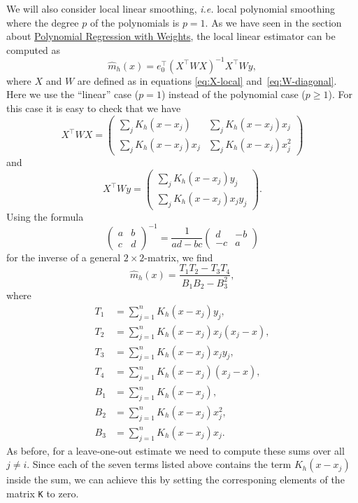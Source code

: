 \documentclass[
  a4paper,
]{article}
\theoremstyle{definition}
\theoremstyle{definition}
\theoremstyle{definition}
\theoremstyle{definition}
\theoremstyle{remark}
\begin{document}
We will also consider local linear smoothing, \emph{i.e.} local polynomial
smoothing where the degree \(p\) of the polynomials is \(p=1\).
As we have seen in the section about \protect\hyperlink{polynomial-regression-with-weights}{Polynomial Regression with Weights},
the local linear estimator can be computed as
\begin{equation*}
  \hat m_h(x)
  = e_0^\top (X^\top W X)^{-1} X^\top W y,
\end{equation*}
where \(X\) and \(W\) are defined as in equations \eqref{eq:X-local}
and~\eqref{eq:W-diagonal}.
Here we use the ``linear'' case (\(p=1\)) instead of the polynomial case (\(p\geq 1\)).
For this case it is easy to check that we have
\begin{equation*}
  X^\top W X
  = \begin{pmatrix}
        \sum_j K_h(x-x_j)     & \sum_j K_h(x-x_j) x_j   \\
        \sum_j K_h(x-x_j) x_j & \sum_j K_h(x-x_j) x_j^2
    \end{pmatrix}
\end{equation*}
and
\begin{equation*}
  X^\top W y
  = \begin{pmatrix}
        \sum_j K_h(x-x_j) y_j     \\
        \sum_j K_h(x-x_j) x_j y_j
    \end{pmatrix}.
\end{equation*}
Using the formula
\begin{equation*}
  \begin{pmatrix}
    a & b \\
    c & d
  \end{pmatrix}^{-1}
  = \frac{1}{ad-bc} \begin{pmatrix}
    d & -b \\
    -c & a
  \end{pmatrix}
\end{equation*}
for the inverse of a general \(2\times 2\)-matrix, we find
\begin{equation*}
  \hat m_h(x)
  = \frac{T_1 T_2 - T_3 T_4}{B_1 B_2 - B_3^2},
\end{equation*}
where
\begin{align*}
  T_1 &= \sum_{j=1}^n K_h(x-x_j) y_j       , \\
  T_2 &= \sum_{j=1}^n K_h(x-x_j) x_j(x_j-x), \\
  T_3 &= \sum_{j=1}^n K_h(x-x_j) x_j y_j   , \\
  T_4 &= \sum_{j=1}^n K_h(x-x_j) (x_j-x)   , \\
  B_1 &= \sum_{j=1}^n K_h(x-x_j)           , \\
  B_2 &= \sum_{j=1}^n K_h(x-x_j) x_j^2     , \\
  B_3 &= \sum_{j=1}^n K_h(x-x_j) x_j       .
\end{align*}
As before, for a leave-one-out estimate we need to compute these sums over all
\(j\neq i\). Since each of the seven terms listed above contains the term
\(K_h(x-x_j)\) inside the sum, we can achieve this by setting the corresponing
elements of the matrix \texttt{K} to zero.
\end{document}
